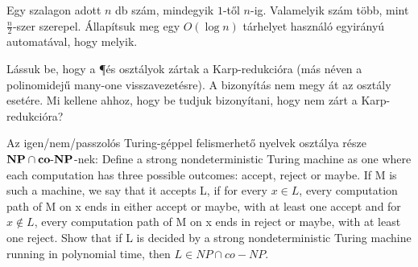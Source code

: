 

\begin{Exercise}[counter={sorszam}, difficulty=1]
 Egy szalagon adott $n$ db szám, mindegyik $1$-től $n$-ig. Valamelyik szám több, mint $\frac{n}{2}$-szer szerepel. Állapítsuk meg egy $O(\log n)$ tárhelyet használó egyirányú automatával, hogy melyik.
\end{Exercise}





\begin{Exercise}[counter={sorszam}, difficulty=0]
Lássuk be, hogy a \P és \EXP osztályok zártak a Karp-redukcióra (más néven a polinomidejű many-one visszavezetésre). A bizonyítás nem megy át az \E osztály esetére. Mi kellene ahhoz, hogy be tudjuk bizonyítani, hogy \E nem zárt a Karp-redukcióra?
\end{Exercise}


\begin{Exercise}[counter={sorszam}, difficulty=0]
Az igen/nem/passzolós Turing-géppel felismerhető nyelvek osztálya része $\mbox{\ensuremath{\mathbf{NP}}} \cap \mbox{\ensuremath{\mathbf{co\text{-}NP}}}$-nek:
Define a strong nondeterministic Turing machine as one where each computation
has three possible outcomes: accept, reject or maybe. If M is such
a machine, we say that it accepts L, if for every $x \in L$, every computation
path of M on x ends in either accept or maybe, with at least one accept
and for $x \notin L$, every computation path of M on x ends in reject or maybe,
with at least one reject.
Show that if L is decided by a strong nondeterministic Turing machine
running in polynomial time, then $L \in NP \cap co-NP$.
\end{Exercise}




